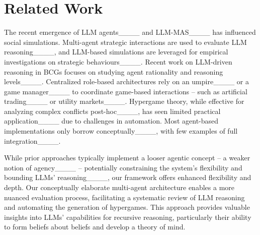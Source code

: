 \section{Related Work}
The recent emergence of LLM agents____ and LLM-MAS____ has influenced social simulations. Multi-agent strategic interactions are used to evaluate LLM reasoning____, and LLM-based simulations are leveraged for empirical investigations on strategic behaviours____. Recent work on LLM-driven reasoning in BCGs focuses on studying agent rationality and reasoning levels____. Centralized role-based architectures rely on an umpire____ or a game manager____ to coordinate game-based interactions -- such as artificial trading____ or utility markets____.
Hypergame theory, while effective for analyzing complex conflicts post-hoc____, has seen limited practical application____ due to challenges in automation. Most agent-based implementations only borrow conceptually____, with few examples of full integration____.

While prior approaches typically implement a looser agentic concept -- a weaker notion of agency____ -- potentially constraining the system's flexibility and bounding LLMs' reasoning____, our framework offers enhanced flexibility and depth. Our conceptually elaborate multi-agent architecture enables a more nuanced evaluation process, facilitating a systematic review of LLM reasoning and automating the generation of hypergames. This approach provides valuable insights into LLMs' capabilities for recursive reasoning, particularly their ability to form beliefs about beliefs and develop a theory of mind.